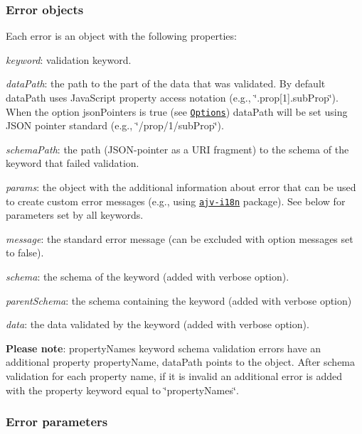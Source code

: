 \subsubsection*{Error objects}

Each error is an object with the following properties\+:


\begin{DoxyItemize}
\item {\itshape keyword}\+: validation keyword.
\item {\itshape data\+Path}\+: the path to the part of the data that was validated. By default {\ttfamily data\+Path} uses Java\+Script property access notation (e.\+g., {\ttfamily \char`\"{}.\+prop\mbox{[}1\mbox{]}.\+sub\+Prop\char`\"{}}). When the option {\ttfamily json\+Pointers} is true (see \href{#options}{\tt Options}) {\ttfamily data\+Path} will be set using J\+S\+ON pointer standard (e.\+g., {\ttfamily \char`\"{}/prop/1/sub\+Prop\char`\"{}}).
\item {\itshape schema\+Path}\+: the path (J\+S\+O\+N-\/pointer as a U\+RI fragment) to the schema of the keyword that failed validation.
\item {\itshape params}\+: the object with the additional information about error that can be used to create custom error messages (e.\+g., using \href{https://github.com/epoberezkin/ajv-i18n}{\tt ajv-\/i18n} package). See below for parameters set by all keywords.
\item {\itshape message}\+: the standard error message (can be excluded with option {\ttfamily messages} set to false).
\item {\itshape schema}\+: the schema of the keyword (added with {\ttfamily verbose} option).
\item {\itshape parent\+Schema}\+: the schema containing the keyword (added with {\ttfamily verbose} option)
\item {\itshape data}\+: the data validated by the keyword (added with {\ttfamily verbose} option).
\end{DoxyItemize}

{\bfseries Please note}\+: {\ttfamily property\+Names} keyword schema validation errors have an additional property {\ttfamily property\+Name}, {\ttfamily data\+Path} points to the object. After schema validation for each property name, if it is invalid an additional error is added with the property {\ttfamily keyword} equal to {\ttfamily \char`\"{}property\+Names\char`\"{}}.

\subsubsection*{Error parameters}

